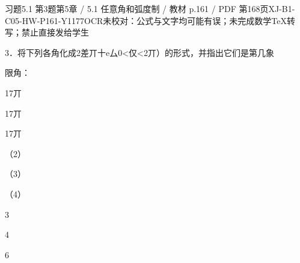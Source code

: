 \begin{bankitem}{习题5.1 第3题}{第5章 / 5.1 任意角和弧度制 / 教材 p.161 / PDF 第168页}{XJ-B1-C05-HW-P161-Y1177}{OCR未校对：公式与文字均可能有误；未完成数学TeX转写；禁止直接发给学生}
\begin{ocrdraft}
\par
3．将下列各角化成2差丌十e厶0<仅<2丌）的形式，并指出它们是第几象
\par
限角：
\par
17丌
\par
17丌
\par
17丌
\par
（2）
\par
（3）
\par
（4）
\par
3
\par
4
\par
6
\end{ocrdraft}
\end{bankitem}
